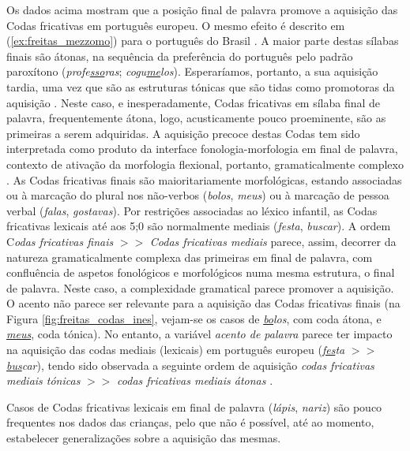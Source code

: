 \documentclass[output=paper]{LSP/langsci}
\begin{document}
Os dados acima mostram que a posição final de palavra promove a aquisição das Codas fricativas em português europeu. O mesmo efeito é descrito em (\ref{ex:freitas_mezzomo}) para o português do Brasil \citep{mezzomo2004}. A maior parte destas sílabas finais são átonas, na sequência da preferência do português pelo padrão paroxítono (\textit{profe\underline{sso}ras}; \textit{cogu\underline{me}los}). Esperaríamos, portanto, a sua aquisição tardia, uma vez que são as estruturas tónicas que são tidas como promotoras da aquisição \citep{fikkert1994}. Neste caso, e inesperadamente, Codas fricativas em sílaba final de palavra, frequentemente átona, logo, acusticamente pouco proeminente, são as primeiras a serem adquiridas. A aquisição precoce destas Codas tem sido interpretada como produto da interface fonologia-morfologia em final de palavra, contexto de ativação da morfologia flexional, portanto, gramaticalmente complexo \citep{freitas1997}. As Codas fricativas finais são maioritariamente morfológicas, estando associadas ou à marcação do plural nos não-verbos (\textit{bolos}, \textit{meus}) ou à marcação de pessoa verbal (\textit{falas}, \textit{gostavas}). Por restrições associadas ao léxico infantil, as Codas fricativas lexicais até aos 5;0 são normalmente mediais (\textit{festa}, \textit{buscar}). A ordem C\textit{odas fricativas finais} $>>$ \textit{Codas fricativas mediais} \citep{freitas1997} parece, assim, decorrer da natureza gramaticalmente complexa das primeiras em final de palavra, com confluência de aspetos fonológicos e morfológicos numa mesma estrutura, o final de palavra. Neste caso, a complexidade gramatical parece promover a aquisição. O acento não parece ser relevante para a aquisição das Codas fricativas finais (na Figura \ref{fig:freitas_codas_ines}, vejam-se os casos de \textit{\underline{bo}los}, com coda átona, e \textit{\underline{meus}}, coda tónica). No entanto, a variável \textit{acento de palavra} parece ter impacto na aquisição das codas mediais (lexicais) em português europeu (\textit{\underline{fes}ta} $>>$ \textit{\underline{bus}car}), tendo sido observada a seguinte ordem de aquisição \textit{codas fricativas mediais tónicas} $>>$ \textit{codas fricativas mediais átonas} \citep{freitas1997}.

Casos de Codas fricativas lexicais em final de palavra (\textit{lápis}, \textit{nariz}) são pouco frequentes nos dados das crianças, pelo que não é possível, até ao momento, estabelecer generalizações sobre a aquisição das mesmas. 
\end{document}
